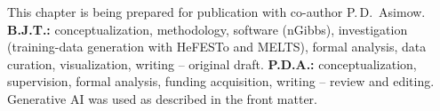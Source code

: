 \begin{chaptercredit}
This chapter is being prepared for publication with co-author P.\,D.\ Asimow.
\textbf{B.J.T.:} conceptualization, methodology, software (nGibbs), investigation
(training-data generation with HeFESTo and MELTS), formal analysis, data curation,
visualization, writing -- original draft.
\textbf{P.D.A.:} conceptualization, supervision, formal analysis, funding acquisition, writing -- review and editing.
Generative AI was used as described in the front matter.
\end{chaptercredit}
